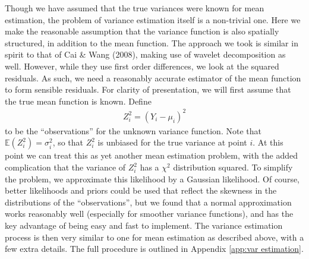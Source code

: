 \documentclass[12pt]{article}
\newcommand{\s}{\sigma}
\begin{document}
Though we have assumed that the true variances were known for mean estimation, the problem of variance estimation itself is a non-trivial one. Here we make the reasonable assumption that the variance function is also spatially structured, in addition to the mean function. The approach we took is similar in spirit to that of Cai \& Wang (2008), making use of wavelet decomposition as well. However, while they use first order differences, we look at the squared residuals. As such, we need a reasonably accurate estimator of the mean function to form sensible residuals. For clarity of presentation, we will first assume that the true mean function is known. Define
\begin{eqnarray}\label{eq:varobs1}
Z_i^2=(Y_i-\mu_i)^2
\end{eqnarray}
to be the ``observations'' for the unknown variance function. Note that $\mathbb{E}(Z_i^2)=\s_i^2$, so that $Z_i^2$ is unbiased for the true variance at point $i$. At this point we can treat this as yet another mean estimation problem, with the added complication that the variance of $Z_i^2$ has a $\chi^2$ distribution squared. To simplify the problem, we approximate this likelihood by a Gaussian likelihood. Of course, better likelihoods and priors could be used that reflect the skewness in the distributions of the ``observations'', but we found that a normal approximation works reasonably well (especially for smoother variance functions), and has the key advantage of being easy and fast to implement. The variance estimation process is then very similar to one for mean estimation as described above, with a few extra details. The full procedure is outlined in Appendix \ref{app:var estimation}.
\end{document}
